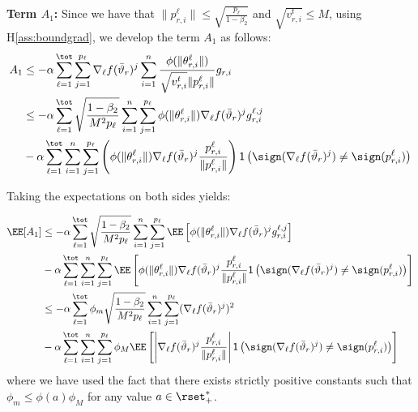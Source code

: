 \documentclass{article}
\begin{document}
\textbf{ Term $A_1$:}
Since we have that $\|p_{r,i}^{\ell}\| \leq \sqrt{\frac{p_\ell}{1-\beta_2}}$ and $\sqrt{v^{t}_{r,i}} \leq M$, using H\ref{ass:boundgrad}, we develop the term $A_1$ as follows:
\begin{align}
A_1 & \leq - \alpha \sum_{\ell=1}^\tot \sum_{j=1}^{p_\ell} \nabla_{\ell} f(\bar{\vartheta}_r)^j  \sum_{i = 1}^n \frac{\phi(\|\theta_{r,i}^{\ell}\|)}{\sqrt{v^{t}_{r,i}} \|p_{r,i}^{\ell}\|} g_{r,i}\\
& \leq - \alpha \sum_{\ell=1}^\tot  \sqrt{\frac{1-\beta_2}{M^2 p_\ell}} \sum_{i = 1}^n \sum_{j=1}^{p_\ell}   \phi(\|\theta_{r,i}^{\ell}\|)  \nabla_{\ell} f(\bar{\vartheta}_r)^j  g^{\ell, j}_{r,i}\\
& - \alpha \sum_{\ell=1}^\tot \sum_{i = 1}^n \sum_{j=1}^{p_\ell}   \left( \phi(\|\theta_{r,i}^{\ell}\|)  \nabla_{\ell} f(\bar{\vartheta}_r)^j  \frac{p_{r,i}^{\ell}}{ \|p_{r,i}^{\ell}\|}\right)\mathsf{1}\left( \sign(  \nabla_{\ell} f(\bar{\vartheta}_r)^j) \neq  \sign( p_{r,i}^{\ell}) \right)
\end{align}

Taking the expectations on both sides yields:

\begin{align}
\EE[A_1]  & \leq - \alpha \sum_{\ell=1}^\tot  \sqrt{\frac{1-\beta_2}{M^2 p_\ell}} \sum_{i = 1}^n \sum_{j=1}^{p_\ell} \EE \left[  \phi(\|\theta_{r,i}^{\ell}\|)  \nabla_{\ell} f(\bar{\vartheta}_r)^j  g^{\ell, j}_{r,i}\right]\\
& - \alpha \sum_{\ell=1}^\tot \sum_{i = 1}^n \sum_{j=1}^{p_\ell}   \EE\left[ \phi(\|\theta_{r,i}^{\ell}\|)  \nabla_{\ell} f(\bar{\vartheta}_r)^j  \frac{p_{r,i}^{\ell}}{ \|p_{r,i}^{\ell}\|}\mathsf{1} \left( \sign(  \nabla_{\ell} f(\bar{\vartheta}_r)^j) \neq  \sign( p_{r,i}^{\ell}) \right) \right]\\
& \leq - \alpha \sum_{\ell=1}^\tot  \phi_m \sqrt{\frac{1-\beta_2}{M^2 p_\ell}} \sum_{i = 1}^n \sum_{j=1}^{p_\ell}    (\nabla_{\ell} f(\bar{\vartheta}_r)^j)^2\\
& - \alpha \sum_{\ell=1}^\tot \sum_{i = 1}^n \sum_{j=1}^{p_\ell} \phi_M  \EE\left[ \left| \nabla_{\ell} f(\bar{\vartheta}_r)^j  \frac{p_{r,i}^{\ell}}{ \|p_{r,i}^{\ell}\|}\right| \mathsf{1}\left( \sign(  \nabla_{\ell} f(\bar{\vartheta}_r)^j) \neq  \sign( p_{r,i}^{\ell})\right) \right]\\
\end{align}
where we have used the fact that there exists strictly positive constants such that $\phi_m \leq  \phi(a) \phi_M$ for any value $a \in \rset^*_+$.
\end{document}
